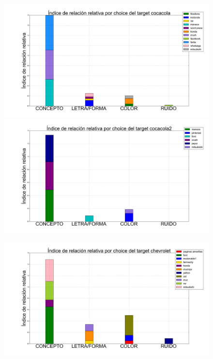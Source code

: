 \documentclass{beamer}
\begin{document}
\begin{frame}
\begin{figure}[h]
\begin{minipage}[c]{1\textwidth}
  \end{minipage}
\end{figure}
\end{frame}

\begin{frame}
\begin{figure}[h]
 \centering
  \begin{minipage}[c]{1\textwidth}
	\includegraphics[scale=0.108]{cocacola.png}
	\includegraphics[scale=0.108]{cocacola2.png}
  \end{minipage}
  \begin{minipage}[c]{1\textwidth}
	\includegraphics[scale=0.108]{chevrolet.png}

\end{minipage}
\end{figure}
\end{frame}
\end{document}
